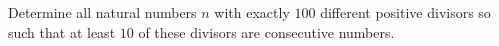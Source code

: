 Determine all natural numbers $n$ with exactly $100$ different positive divisors so
such that at least $10$ of these divisors are consecutive numbers.